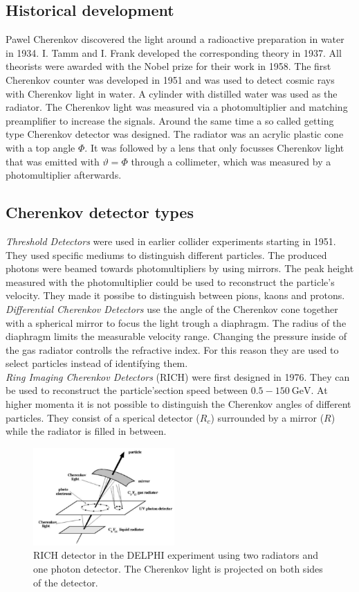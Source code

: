 \subsection{Historical development}
Pawel Cherenkov discovered the light around a radioactive preparation in water in 1934. I. Tamm and I. Frank developed the corresponding theory in 1937. All theorists were awarded with the Nobel prize for their work in 1958. The first Cherenkov counter was developed in 1951 and was used to detect cosmic rays with Cherenkov light in water. A cylinder with distilled water was used as the radiator. The Cherenkov light was measured via a photomultiplier and matching preamplifier to increase the signals.
Around the same time a so called getting type Cherenkov detector was designed. The radiator was an acrylic plastic cone with a top angle $\Phi$. It was followed by a lens that only focusses Cherenkov light that was emitted with $\vartheta = \Phi$ through a collimeter, which was measured by a photomultiplier afterwards.
\subsection{Cherenkov detector types}
\textit{Threshold Detectors} were used in earlier collider experiments starting in 1951. They used specific mediums to distinguish different particles. The produced photons were beamed towards photomultipliers by using mirrors. The peak height measured with the photomultiplier could be used to reconstruct the particle's velocity. They made it possibe to distinguish between pions, kaons and protons.
\textit{Differential Cherenkov Detectors} use the angle of the Cherenkov cone together with a spherical mirror to focus the light trough a diaphragm. The radius of the diaphragm limits the measurable velocity range. Changing the pressure inside of the gas radiator controlls the refractive index. For this reason they are used to select particles instead of identifying them.\\
\textit{Ring Imaging Cherenkov Detectors} (RICH) were first designed in 1976. They can be used to reconstruct the particle'section speed between $0.5-\SI{150}{\giga\electronvolt}$. At higher momenta it is not possible to distinguish the Cherenkov angles of different particles. They consist of a sperical detector ($R_c$) surrounded by a mirror ($R$) while the radiator is filled in between.

\begin{figure}
    \includegraphics[width=0.48\textwidth]{graphics/RICH.png}
    \caption{RICH detector in the DELPHI experiment using two radiators and one photon detector. The Cherenkov light is projected on both sides of the detector. \cite{cherenkov}}
		\label{fig:RICH}
  \end{figure}
  \FloatBarrier

